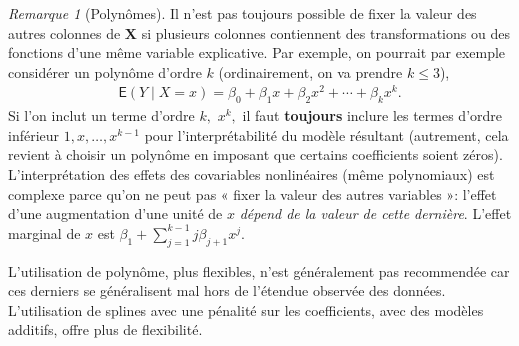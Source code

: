 \documentclass[
  11pt,
  letterpaper,
]{scrbook}
\theoremstyle{plain}
\theoremstyle{plain}
\theoremstyle{definition}
\theoremstyle{definition}
\theoremstyle{remark}
\newtheorem{refremark}{Remarque}[chapter]
\begin{document}
\begin{refremark}[Polynômes]
Il n'est pas toujours possible de fixer la valeur des autres colonnes de
\(\mathbf{X}\) si plusieurs colonnes contiennent des transformations ou
des fonctions d'une même variable explicative. Par exemple, on pourrait
par exemple considérer un polynôme d'ordre \(k\) (ordinairement, on va
prendre \(k\leq 3\)), \begin{align*}
\mathsf{E}(Y \mid X=x)=\beta_0+ \beta_1 x+ \beta_2 x^2 + \cdots +\beta_k x^k.
\end{align*} Si l'on inclut un terme d'ordre \(k,\) \(x^k,\) il faut
\textbf{toujours} inclure les termes d'ordre inférieur
\(1, x, \ldots, x^{k-1}\) pour l'interprétabilité du modèle résultant
(autrement, cela revient à choisir un polynôme en imposant que certains
coefficients soient zéros). L'interprétation des effets des covariables
nonlinéaires (même polynomiaux) est complexe parce qu'on ne peut pas «
fixer la valeur des autres variables »: l'effet d'une augmentation d'une
unité de \(x\) \emph{dépend de la valeur de cette dernière}. L'effet
marginal de \(x\) est \(\beta_1 + \sum_{j=1}^{k-1}j \beta_{j+1}x^j.\)

L'utilisation de polynôme, plus flexibles, n'est généralement pas
recommendée car ces derniers se généralisent mal hors de l'étendue
observée des données. L'utilisation de splines avec une pénalité sur les
coefficients, avec des modèles additifs, offre plus de flexibilité.

\label{rem-polynomes}

\end{refremark}
\end{document}
